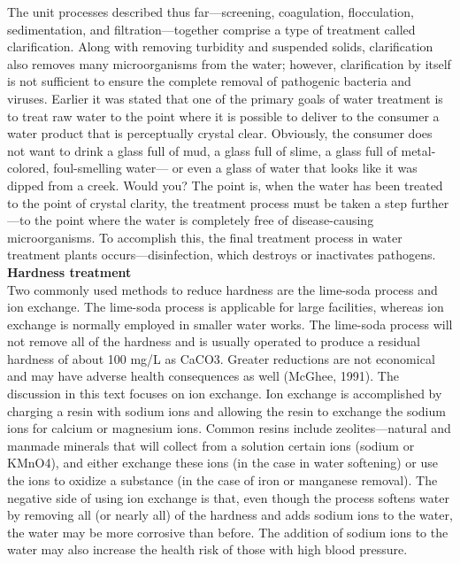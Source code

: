 The unit processes described thus far—screening, coagulation, flocculation, sedimentation, and filtration—together comprise a type of treatment called clarification. Along with removing turbidity and suspended solids, clarification also removes many microorganisms from the water; however, clarification by itself is not sufficient to ensure the complete removal of pathogenic bacteria and viruses.
Earlier it was stated that one of the primary goals of water treatment is to treat raw water to the point where it is possible to deliver to the consumer a water product that is perceptually crystal clear. Obviously, the consumer does not want to drink a glass full of mud, a glass full of slime, a glass full of metal-colored, foul-smelling water— or even a glass of water that looks like it was dipped from a creek. Would you? The point is, when the water has been treated to the point of crystal clarity, the treatment process must be taken a step further—to the point where the water is completely free of disease-causing microorganisms. To accomplish this, the final treatment process in water treatment plants occurs—disinfection, which destroys or inactivates pathogens.\\

\textbf{Hardness treatment}\\
Two commonly used methods to reduce hardness are the lime-soda process and ion exchange. The lime-soda process is applicable for large facilities, whereas ion exchange is normally employed in smaller water works. The lime-soda process will not remove all of the hardness and is usually operated to produce a residual hardness of about 100 mg/L as CaCO3. Greater reductions are not economical and may have adverse health consequences as well (McGhee, 1991). The discussion in this text focuses on ion exchange. Ion exchange is accomplished by charging a resin with sodium ions and allowing the resin to exchange the sodium ions for calcium or magnesium ions. Common resins include zeolites—natural and manmade minerals that will collect from a solution certain ions (sodium or KMnO4), and either exchange these ions (in the case in water softening) or use the ions to oxidize a substance (in the case of iron or manganese removal). The negative side of using ion exchange is that, even though the process softens water by removing all (or nearly all) of the hardness and adds sodium ions to the water, the water may be more corrosive than before. The addition of sodium ions to the water may also increase the health risk of those with high blood pressure.

